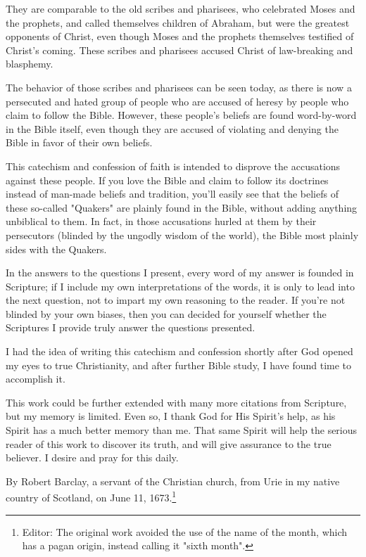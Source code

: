 \documentclass[../main.tex]{subfiles}
\begin{document}
	They are comparable to the old scribes and pharisees, who celebrated Moses and the prophets, and called themselves children of Abraham, but were the greatest opponents of Christ, even though Moses and the prophets themselves testified of Christ's coming. These scribes and pharisees accused Christ of law-breaking and blasphemy.
	
	The behavior of those scribes and pharisees can be seen today, as there is now a persecuted and hated group of people who are accused of heresy by people who claim to follow the Bible. However, these people's beliefs are found word-by-word in the Bible itself, even though they are accused of violating and denying the Bible in favor of their own beliefs.
	
	This catechism and confession of faith is intended to disprove the accusations against these people. If you love the Bible and claim to follow its doctrines instead of man-made beliefs and tradition, you'll easily see that the beliefs of these so-called "Quakers" are plainly found in the Bible, without adding anything unbiblical to them. In fact, in those accusations hurled at them by their persecutors (blinded by the ungodly wisdom of the world), the Bible most plainly sides with the Quakers.
	
	In the answers to the questions I present, every word of my answer is founded in Scripture; if I include my own interpretations of the words, it is only to lead into the next question, not to impart my own reasoning to the reader. If you're not blinded by your own biases, then you can decided for yourself whether the Scriptures I provide truly answer the questions presented.
	
	I had the idea of writing this catechism and confession shortly after God opened my eyes to true Christianity, and after further Bible study, I have found time to accomplish it.
	
	This work could be further extended with many more citations from Scripture, but my memory is limited. Even so, I thank God for His Spirit's help, as his Spirit has a much better memory than me. That same Spirit will help the serious reader of this work to discover its truth, and will give assurance to the true believer. I desire and pray for this daily.
	
	By Robert Barclay, a servant of the Christian church, from Urie in my native country of Scotland, on June 11, 1673.\footnote{Editor: The original work avoided the use of the name of the month, which has a pagan origin, instead calling it "sixth month".}
	
	
\end{document}
